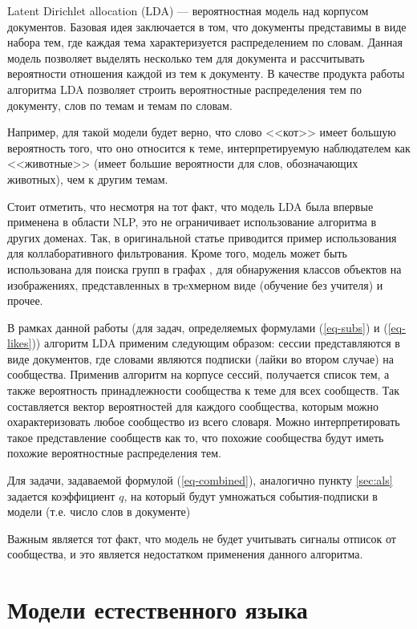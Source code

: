 \documentclass[times,specification,annotation]{itmo-student-thesis}
\begin{document}
Latent Dirichlet allocation (LDA) \cite{lda2003} --- вероятностная модель над корпусом документов. Базовая идея заключается в том, что документы представимы в виде набора тем, где каждая тема характеризуется распределением по словам. Данная модель позволяет выделять несколько тем для документа и рассчитывать вероятности отношения каждой из тем к документу.
В качестве продукта работы алгоритма LDA позволяет строить вероятностные распределения тем по документу, слов по темам и темам по словам.

Например, для такой модели будет верно, что слово <<кот>> имеет большую вероятность того, что оно относится к теме, интерпретируемую наблюдателем как <<животные>> (имеет большие вероятности для слов, обозначающих животных), чем к другим темам. 

Стоит отметить, что несмотря на тот факт, что модель LDA была впервые применена в области NLP, это не ограничивает использование алгоритма в других доменах. Так, в оригинальной статье \cite{lda2003} приводится пример использования для коллаборативного фильтрования. Кроме того, модель может быть использована для поиска групп в графах \cite{Henderson2009}, для обнаружения классов объектов на изображениях, представленных в трeхмерном виде (обучение без учителя) \cite{Endres2009} и прочее.

В рамках данной работы (для задач, определяемых формулами (\ref{eq-subs}) и (\ref{eq-likes})) алгоритм LDA применим следующим образом: сессии представляются в виде документов, где словами являются подписки (лайки во втором случае) на сообщества. Применив алгоритм на корпусе сессий, получается список тем, а также вероятность принадлежности сообщества к теме для всех сообществ. Так составляется вектор вероятностей для каждого сообщества, которым можно охарактеризовать любое сообщество из всего словаря. Можно интерпретировать такое представление сообществ как то, что похожие сообщества будут иметь похожие вероятностные распределения тем. 

Для задачи, задаваемой формулой (\ref{eq-combined}), аналогично пункту \ref{sec:als} задается коэффициент $q$, на который будут умножаться события-подписки в модели (т.е. число слов в документе) 
 
Важным является тот факт, что модель не будет учитывать сигналы отписок от сообщества, и это является недостатком применения данного алгоритма. 

\section{Модели естественного языка}\label{sec:nlp-intro}
\end{document}
